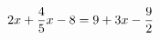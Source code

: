 \documentclass[preview]{standalone}
\begin{document}
\begin{align*}
\special{dvisvgm:raw <g id='unique000'>}2x + \frac{4}{5} x - 8 = 9 + 3x - \frac{9}{2}\special{dvisvgm:raw </g>}
\end{align*}
\end{document}
